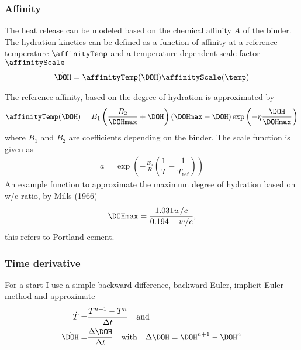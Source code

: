 \subsubsection{Affinity}
The heat release can be modeled based on the chemical affinity $A$ of the binder.
The hydration kinetics can be defined as a function of affinity at a reference temperature $\affinityTemp$ and a temperature dependent scale factor ${\affinityScale}$
\begin{align}
	\dot{\DOH} = \affinityTemp(\DOH){\affinityScale}(\temp)\label{eq:affinitydot}
\end{align}


The reference affinity, based on the degree of hydration is approximated by
\begin{align}
	\affinityTemp(\DOH) = B_1 \left(\frac{B_2}{\DOHmax} + \DOH\right) (\DOHmax - \DOH)\exp\left(-\eta \frac{\DOH}{\DOHmax}\right)
\end{align}
where $B_1$ and $B_2$ are coefficients depending on the binder.
The scale function is given as
\begin{align}
	a = \exp\left(-\frac{E_{\text{a}}}{R}\left(\dfrac{1}{T}-\dfrac{1}{T_{\text{ref}}}\right)\right)
\end{align}
An example function to approximate the maximum degree of hydration based on w/c ratio, by Mills (1966)
\begin{align}
	\DOHmax = \dfrac{1.031w/c}{0.194 + w/c},
\end{align}
this refers to Portland cement. 
\subsubsection{Time derivative}
For a start I use a simple backward difference, backward Euler, implicit Euler method and approximate
\begin{align}
	\dot{T} =& \dfrac{T^{n+1}-T^{n}}{\Delta t} \quad\text{and}\label{eq:timediscr}\\
	\dot{\DOH} =& \dfrac{\Delta \DOH}{\Delta t}  \quad\text{with}\quad
	\Delta \DOH  =  \DOH^{n+1}- \DOH^{n}
	\label{eq:timediscr2}
\end{align}
